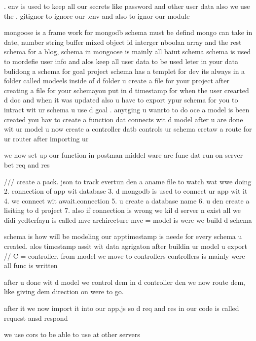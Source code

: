 . env is used to keep all our secrets like password and other user data
also we use the . gitignor to ignore our .env and also to ignor our module

mongoose is a frame work for mongodb 
schema must be defind mongo can take in date, number string buffer mixed object id interger nboolan array and the rest
 schema for a blog, 
 schema in mongoose is mainly all baiut schema
 schema is used to mordefie user info and alos keep all user data to be used leter  in your data
 bulidong a schema for goal project schema has a templet for dev its always in a folder called modeels
 inside of d folder u create a file for your project
 after creating  a file for your schemayou put in d timestamp for when the user crearted d doc and when it was updated
 also u have to export ypur schema for you to intract wit ur schema u use d goal  . anytging u wanrto to do 
  oce a model is been created you hav to  create a function dat connects wit d model
  after u are done wit ur model u now create a controller datb controls ur schema
cretaw a route for ur router after importing ur 

 we now set up our function in postman 
 middel ware are func dat run on server bet req and res

 /// create a pack. json to track evertun
  den a aname file to watch wat wwe doing
  2. connection of app wit database
  3. d mongodb is used to connect ur app wit it
  4. we connect wit await.connection
  5. u create a database name
 6. u den create a lisiting to d project
 7. also if connection is wrong we kil d server n exist
 all we didi yedterfayn is called mvc archirecture
 mvc =  model is were we build d schema

 schema is how will be modeling our apptimestamp is neede for every schema u created.
 alos timestamp assit wit data agrigaton
 after buildin ur model u  export 
 // C = controller. 
  from model we move to controllers 
  controllers is mainly were all  func is written 

  after u done wit d model we control dem in d controller den we now route dem, like giving dem direction on were to go.

  after it we now import it into our app.js 
  so d req and res in our code is called request ansd respond

  we use cors to be able to use at other servers
 

